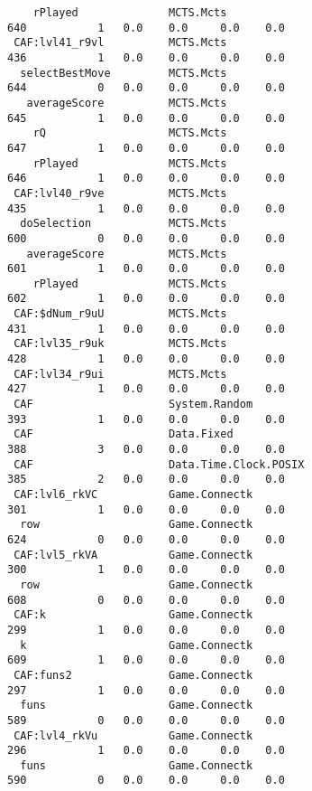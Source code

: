 \begin{tiny}
\begin{verbatim}
    rPlayed              MCTS.Mcts                                            640           1   0.0    0.0     0.0    0.0
 CAF:lvl41_r9vl          MCTS.Mcts                                            436           1   0.0    0.0     0.0    0.0
  selectBestMove         MCTS.Mcts                                            644           0   0.0    0.0     0.0    0.0
   averageScore          MCTS.Mcts                                            645           1   0.0    0.0     0.0    0.0
    rQ                   MCTS.Mcts                                            647           1   0.0    0.0     0.0    0.0
    rPlayed              MCTS.Mcts                                            646           1   0.0    0.0     0.0    0.0
 CAF:lvl40_r9ve          MCTS.Mcts                                            435           1   0.0    0.0     0.0    0.0
  doSelection            MCTS.Mcts                                            600           0   0.0    0.0     0.0    0.0
   averageScore          MCTS.Mcts                                            601           1   0.0    0.0     0.0    0.0
    rPlayed              MCTS.Mcts                                            602           1   0.0    0.0     0.0    0.0
 CAF:$dNum_r9uU          MCTS.Mcts                                            431           1   0.0    0.0     0.0    0.0
 CAF:lvl35_r9uk          MCTS.Mcts                                            428           1   0.0    0.0     0.0    0.0
 CAF:lvl34_r9ui          MCTS.Mcts                                            427           1   0.0    0.0     0.0    0.0
 CAF                     System.Random                                        393           1   0.0    0.0     0.0    0.0
 CAF                     Data.Fixed                                           388           3   0.0    0.0     0.0    0.0
 CAF                     Data.Time.Clock.POSIX                                385           2   0.0    0.0     0.0    0.0
 CAF:lvl6_rkVC           Game.Connectk                                        301           1   0.0    0.0     0.0    0.0
  row                    Game.Connectk                                        624           0   0.0    0.0     0.0    0.0
 CAF:lvl5_rkVA           Game.Connectk                                        300           1   0.0    0.0     0.0    0.0
  row                    Game.Connectk                                        608           0   0.0    0.0     0.0    0.0
 CAF:k                   Game.Connectk                                        299           1   0.0    0.0     0.0    0.0
  k                      Game.Connectk                                        609           1   0.0    0.0     0.0    0.0
 CAF:funs2               Game.Connectk                                        297           1   0.0    0.0     0.0    0.0
  funs                   Game.Connectk                                        589           0   0.0    0.0     0.0    0.0
 CAF:lvl4_rkVu           Game.Connectk                                        296           1   0.0    0.0     0.0    0.0
  funs                   Game.Connectk                                        590           0   0.0    0.0     0.0    0.0
  \end{verbatim}
  \end{tiny}